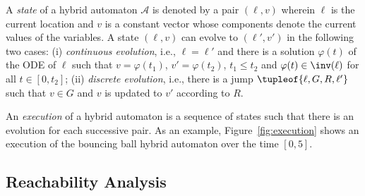 A \emph{state} of a hybrid automaton $\mathcal{A}$ is denoted by a pair $(\ell, v)$ wherein $\ell$ is the current location and $v$ is a constant vector whose components denote the current values of the variables. A state $(\ell,v)$ can evolve to $(\ell', v')$ in the following two cases: (i) \emph{continuous evolution}, i.e., $\ell = \ell'$ and there is a solution $\varphi(t)$ of the ODE of $\ell$ such that $v = \varphi(t_1)$, $v' = \varphi(t_2)$, $t_1 \leq t_2$ and $\varphi(t) \in \inv(\ell)$ for all $t \in [0,t_2]$; (ii) \emph{discrete evolution}, i.e., there is a jump $\tupleof{\ell, G, R, \ell'}$ such that $v\in G$ and $v$ is updated to $v'$ according to $R$.

An \emph{execution} of a hybrid automaton is a sequence of states such that there is an evolution for each successive pair. As an example, Figure~\ref{fig:execution} shows an execution of the bouncing ball hybrid automaton over the time $[0,5]$.




\subsection{Reachability Analysis}







